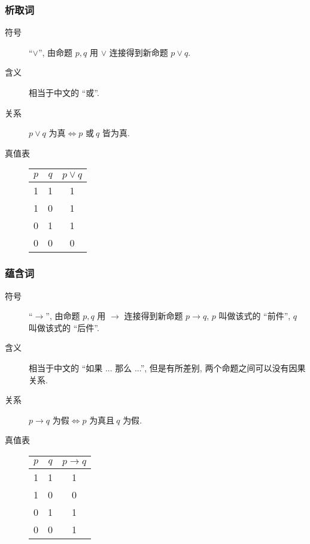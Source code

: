 \documentclass[
    color=black,
    device=normal,
    lang=cn
]{elegantnote}
\begin{document}
\subsubsection{析取词}
\begin{description}
    \item[符号] ``$\lor$'', 由命题 $p,q$ 用 $\lor$ 连接得到新命题 $p\lor q$.
    \item[含义] 相当于中文的 ``或''.
    \item[关系] $p\lor q\text{ 为真}\Leftrightarrow p\text{ 或}\ q\text{ 皆为真}$.
    \item[真值表]
        \begin{tabular}{c|c|c}
            $p$ & $q$ & $p\lor q$ \\
            \hline
            1   & 1   & 1         \\
            1   & 0   & 1         \\
            0   & 1   & 1         \\
            0   & 0   & 0
        \end{tabular}
\end{description}
\subsubsection{蕴含词}
\begin{description}
    \item[符号] ``$\to$'', 由命题 $p,q$ 用 $\to$ 连接得到新命题 $p\to q$, $p$ 叫做该式的 ``前件'', $q$ 叫做该式的 ``后件''.
    \item[含义] 相当于中文的 ``如果 ... 那么 ...'', 但是有所差别, 两个命题之间可以没有因果关系.
    \item[关系] $p\to q\text{ 为假}\Leftrightarrow p\text{ 为真且}\ q\text{ 为假}$.
    \item[真值表]
        \begin{tabular}{c|c|c}
            $p$ & $q$ & $p\to q$ \\
            \hline
            1   & 1   & 1        \\
            1   & 0   & 0        \\
            0   & 1   & 1        \\
            0   & 0   & 1
        \end{tabular}
\end{description}
\end{document}
